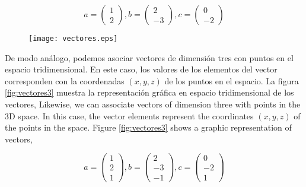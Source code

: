 \begin{equation*}
a=
\begin{pmatrix}
1\\
2
\end{pmatrix},
b=
\begin{pmatrix}
2\\
-3
\end{pmatrix},
c=
\begin{pmatrix}
0\\
-2
\end{pmatrix}
\end{equation*}


\begin{figure}[h]
\centering
\texttt{[image: vectores.eps]}
\label{fig:vectores}
\end{figure}

\begin{paracol}{2}
De modo análogo, podemos asociar vectores de dimensión tres con puntos en el espacio tridimensional. En este caso, los valores de los elementos del vector corresponden con la coordenadas $(x,y,z)$ de los puntos en el espacio. La figura \ref{fig:vectores3} muestra la representación gráfica en espacio tridimensional de los vectores,
\switchcolumn
Likewise, we can associate vectors of dimension three with points in the 3D space. In this case, the vector elements represent the coordinates $(x,y,z)$ of the points in the space. Figure \ref{fig:vectores3} shows a graphic representation of vectors,
\end{paracol}
\begin{equation*}
a=
\begin{pmatrix}
1\\
2\\
1
\end{pmatrix},
b=
\begin{pmatrix}
2\\
-3\\
-1
\end{pmatrix},
c=
\begin{pmatrix}
0\\
-2\\
1
\end{pmatrix}
\end{equation*}

